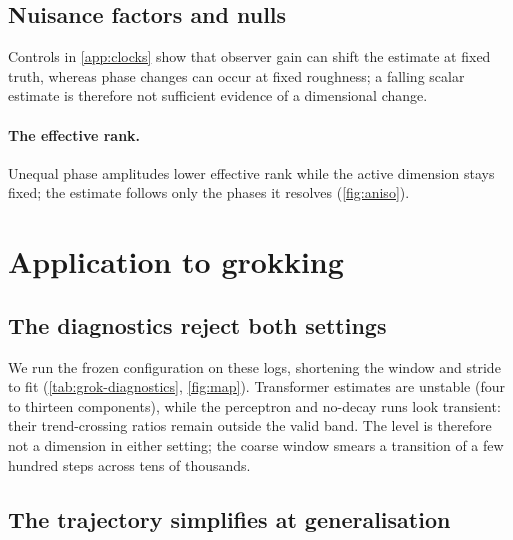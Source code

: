 \documentclass[twoside]{article}
\newenvironment{claude}{\color{claudecolor}}{}
\begin{document}
\begin{claude}
\subsection{Nuisance factors and nulls}\label{sec:nuisance}

Controls in \cref{app:clocks} show that observer gain can shift the estimate at fixed truth,
whereas phase changes can occur at fixed roughness; a falling scalar estimate is therefore not
sufficient evidence of a dimensional change.
\end{claude}

\begin{claude}
\paragraph{The effective rank.}\label{sec:aniso} Unequal phase amplitudes lower effective rank
while the active dimension stays fixed; the estimate follows only the phases it resolves
(\cref{fig:aniso}).
\end{claude}

\section{Application to grokking}\label{sec:grokking}

\subsection{The diagnostics reject both settings}\label{sec:grok-diagnostics}

\begin{claude}
We run the frozen configuration on these logs, shortening the window and stride to fit
(\cref{tab:grok-diagnostics}, \cref{fig:map}). Transformer estimates are unstable (four to
thirteen components), while the perceptron and no-decay runs look transient: their trend-crossing
ratios remain outside the valid band. The level is therefore not a dimension in either setting;
the coarse window smears a transition of a few hundred steps across tens of thousands.
\end{claude}

\subsection{The trajectory simplifies at generalisation}\label{sec:direct}
\end{document}
